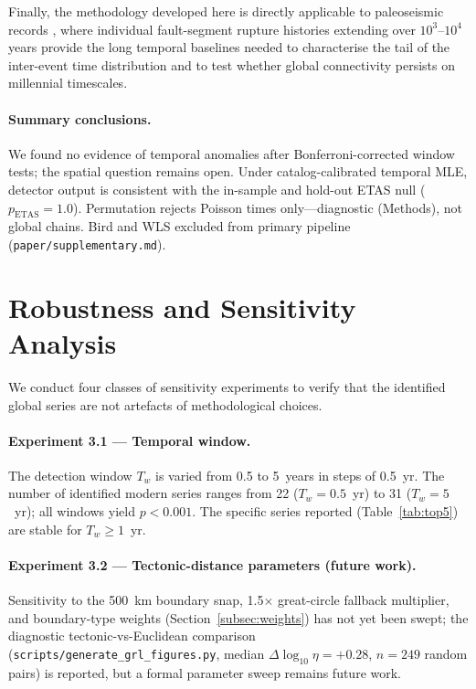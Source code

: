 \documentclass[draft]{agujournal2019}
\begin{document}
Finally, the methodology developed here is directly applicable to
paleoseismic records \citep{McCalpin2009, Griffin2020, Giri2026}, where
individual fault-segment rupture histories extending over $10^3$--$10^4$
years provide the long temporal baselines needed to characterise the
tail of the inter-event time distribution and to test whether global
connectivity persists on millennial timescales.

\paragraph{Summary conclusions.}
We found no evidence of temporal anomalies after Bonferroni-corrected window tests;
the spatial question remains open.
Under catalog-calibrated temporal MLE, detector output is consistent with the
in-sample and hold-out ETAS null ($p_\mathrm{ETAS}=1.0$).
Permutation rejects Poisson times only---diagnostic (Methods), not global chains.
Bird and WLS excluded from primary pipeline (\texttt{paper/supplementary.md}).

\section{Robustness and Sensitivity Analysis}
\label{sec:robustness}

We conduct four classes of sensitivity experiments to verify that the
identified global series are not artefacts of methodological choices.

\paragraph{Experiment 3.1 --- Temporal window.}
The detection window $T_w$ is varied from 0.5 to 5~years in steps of
0.5~yr.  The number of identified modern series ranges from 22 ($T_w =
0.5$~yr) to 31 ($T_w = 5$~yr); all windows yield $p < 0.001$.
The specific series reported (Table~\ref{tab:top5}) are stable for
$T_w \ge 1$~yr.

\paragraph{Experiment 3.2 --- Tectonic-distance parameters (future work).}
Sensitivity to the 500~km boundary snap, 1.5$\times$ great-circle
fallback multiplier, and boundary-type weights (Section~\ref{subsec:weights})
has not yet been swept; the diagnostic tectonic-vs-Euclidean comparison
(\texttt{scripts/generate\_grl\_figures.py}, median $\Delta\log_{10}\eta = +0.28$,
$n = 249$ random pairs) is reported, but a formal parameter sweep remains
future work.
\end{document}
